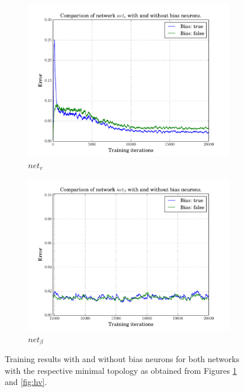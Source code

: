 \documentclass[10pt,a4paper,DIV=11]{scrreprt}
\begin{document}
\begin{figure}[H]
\centering
\begin{subfigure}{\textwidth}
  \centering
  \includegraphics[width=0.8\linewidth]{files/supervised/bv.pdf}
  \caption{$net_v$}
  \label{fig:ha}
\end{subfigure}%
\newline
\begin{subfigure}{\textwidth}
  \centering
  \includegraphics[width=0.8\linewidth]{files/supervised/ba.pdf}
  \caption{$net_\beta$}
  \label{fig:haend}
\end{subfigure}
\newline
\caption{Training results with and without bias neurons for both networks with
         the respective minimal topology as obtained from Figures \ref{fig:ha} and \ref{fig:hv}.}
\label{fig:hvend}
\end{figure}
\end{document}
